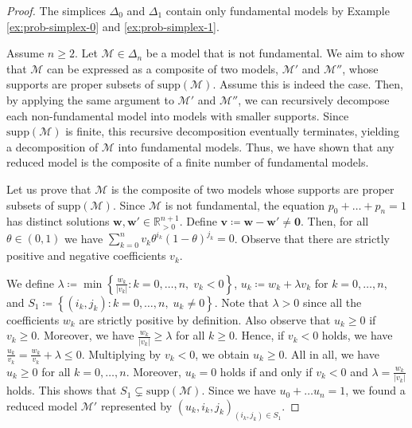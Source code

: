 \begin{proof}
    The simplices \( \Delta_0 \) and \( \Delta_1 \) contain only fundamental models by Example \ref{ex:prob-simplex-0} and \ref{ex:prob-simplex-1}. 
    
    Assume \( n \geq 2 \). Let \( \mathcal{M} \in \Delta_n \) be a model that is not fundamental. We aim to show that \( \mathcal{M} \) can be expressed as a composite of two models, \( \mathcal{M}' \) and \( \mathcal{M}'' \), whose supports are proper subsets of \( \mathrm{supp}(\mathcal{M}) \). Assume this is indeed the case. Then, by applying the same argument to \( \mathcal{M}' \) and \( \mathcal{M}'' \), we can recursively decompose each non-fundamental model into models with smaller supports. Since \( \mathrm{supp}(\mathcal{M}) \) is finite, this recursive decomposition eventually terminates, yielding a decomposition of \( \mathcal{M} \) into fundamental models. Thus, we have shown that any reduced model is the composite of a finite number of fundamental models. 

    Let us prove that \( \mathcal{M} \) is the composite of two models whose supports are proper subsets of \( \mathrm{supp}(\mathcal{M}) \). Since \( \mathcal{M} \) is not fundamental, the equation \( p_0 + \dots + p_n = 1 \) has distinct solutions \( \mathbf w, \mathbf w' \in \mathbb{R}^{n+1}_{> 0} \). Define \( \mathbf v \coloneqq \mathbf w - \mathbf w' \neq \mathbf 0 \). Then, for all \( \theta \in (0,1) \) we have \( \sum_{k=0}^n v_k \theta^{i_k}(1-\theta)^{j_k} = 0  \).
    Observe that there are strictly positive and negative coefficients \( v_k \). 
    
    We define \( \lambda \coloneqq \min \left\{ \frac{w_k}{\lvert v_k \rvert} : k = 0, \dots, n, \; v_k < 0 \right\} \), \( u_k \coloneqq w_k + \lambda v_k \) for \(k = 0, \dots, n \), and \( S_1 \coloneqq \left\{ (i_k, j_k) : k=0, \dots, n, \; u_k \neq 0 \right\} \). Note that \( \lambda > 0 \) since all the coefficients \( w_k \) are strictly positive by definition. Also observe that \( u_k \geq 0 \) if \( v_k \geq 0 \). Moreover, we have \( \frac{w_k}{\lvert v_k \rvert} \geq \lambda \) for all \( k \geq 0 \). Hence, if \( v_k < 0 \) holds, we have \( \frac{u_k}{v_k} = \frac{w_k}{v_k} + \lambda  \leq 0\). Multiplying by \( v_k < 0 \), we obtain \( u_k \geq 0 \). All in all, we have \( u_k \geq 0 \) for all \( k = 0, \dots, n \). Moreover, \( u_k = 0 \) holds if and only if \( v_k < 0 \) and \( \lambda = \frac{w_k}{\lvert v_k \rvert} \) holds. This shows that \( S_1 \subsetneq \mathrm{supp}(\mathcal{M}) \). Since we have \( u_0 + \dots u_n = 1 \), we found a reduced model \( \mathcal{M}' \) represented by \( (u_k, i_k, j_k)_{(i_k,j_k) \in S_1} \).


\end{proof}
